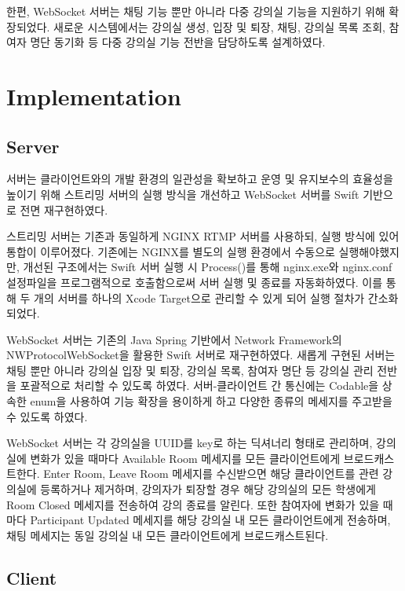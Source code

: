 \documentclass[pdflatex,sn-mathphys-num]{sn-jnl}%
\theoremstyle{thmstyleone}%
\theoremstyle{thmstyletwo}%
\theoremstyle{thmstylethree}%
\begin{document}
한편, WebSocket 서버는 채팅 기능 뿐만 아니라 다중 강의실 기능을 지원하기 위해 확장되었다. 새로운 시스템에서는 강의실 생성, 입장 및 퇴장, 채팅, 강의실 목록 조회, 참여자 명단 동기화 등 다중 강의실 기능 전반을 담당하도록 설계하였다.

\section{Implementation}\label{sec3}

\subsection{Server}\label{subsec2}

서버는 클라이언트와의 개발 환경의 일관성을 확보하고 운영 및 유지보수의 효율성을 높이기 위해 스트리밍 서버의 실행 방식을 개선하고 WebSocket 서버를 Swift 기반으로 전면 재구현하였다.

스트리밍 서버는 기존과 동일하게 NGINX RTMP 서버를 사용하되, 실행 방식에 있어 통합이 이루어졌다. 기존에는 NGINX를 별도의 실행 환경에서 수동으로 실행해야했지만, 개선된 구조에서는 Swift 서버 실행 시 Process()를 통해 nginx.exe와 nginx.conf 설정파일을 프로그램적으로 호출함으로써 서버 실행 및 종료를 자동화하였다. 이를 통해 두 개의 서버를 하나의 Xcode Target으로 관리할 수 있게 되어 실행 절차가 간소화되었다.

WebSocket 서버는 기존의 Java Spring 기반에서 Network Framework\cite{Network}의 NWProtocolWebSocket을 활용한 Swift 서버로 재구현하였다. 새롭게 구현된 서버는 채팅 뿐만 아니라 강의실 입장 및 퇴장, 강의실 목록, 참여자 명단 등 강의실 관리 전반을 포괄적으로 처리할 수 있도록 하였다. 서버-클라이언트 간 통신에는 Codable을 상속한 enum을 사용하여 기능 확장을 용이하게 하고 다양한 종류의 메세지를 주고받을 수 있도록 하였다.

WebSocket 서버는 각 강의실을 UUID를 key로 하는 딕셔너리 형태로 관리하며, 강의실에 변화가 있을 때마다 Available Room 메세지를 모든 클라이언트에게 브로드캐스트한다. Enter Room, Leave Room 메세지를 수신받으면 해당 클라이언트를 관련 강의실에 등록하거나 제거하며, 강의자가 퇴장할 경우 해당 강의실의 모든 학생에게 Room Closed 메세지를 전송하여 강의 종료를 알린다. 또한 참여자에 변화가 있을 때마다 Participant Updated 메세지를 해당 강의실 내 모든 클라이언트에게 전송하며, 채팅 메세지는 동일 강의실 내 모든 클라이언트에게 브로드캐스트된다.

\subsection{Client}\label{subsec3}
\end{document}
